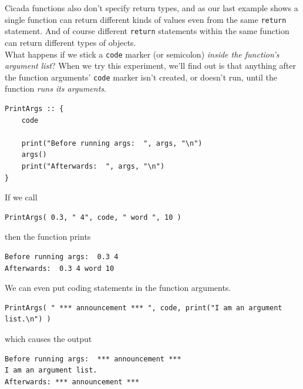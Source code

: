 \documentclass{article}
\newenvironment{code}{
       \begin{list}{}{
               \setlength{\leftmargin}{.4in}
               \setlength{\rightmargin}{0in}
               \setlength{\topsep}{.2in}
       }
       \small
       \item[] }
       { \end{list}   }
\begin{document}
\noindent Cicada functions also don't specify return types, and as our last example shows a single function can return different kinds of values even from the same \verb#return# statement.  And of course different \verb#return# statements within the same function can return different types of objects.\\

What happens if we stick a \texttt{code} marker (or semicolon) \emph{inside the function's argument list}?  When we try this experiment, we'll find out is that anything after the function arguments' \verb#code# marker isn't created, or doesn't run, until the function \emph{runs its arguments}.

\begin{code} \begin{verbatim}
PrintArgs :: {
    code
    
    print("Before running args:  ", args, "\n")
    args()
    print("Afterwards:  ", args, "\n")
}
\end{verbatim} \end{code}

\noindent If we call

\begin{code} \begin{verbatim}
PrintArgs( 0.3, " 4", code, " word ", 10 )
\end{verbatim} \end{code}

\noindent then the function prints

\begin{code} \begin{verbatim}
Before running args:  0.3 4
Afterwards:  0.3 4 word 10
\end{verbatim} \end{code}

\noindent We can even put coding statements in the function arguments.

\begin{code} \begin{verbatim}
PrintArgs( " *** announcement *** ", code, print("I am an argument list.\n") )
\end{verbatim} \end{code}

\noindent which causes the output

\begin{code} \begin{verbatim}
Before running args:  *** announcement *** 
I am an argument list.
Afterwards: *** announcement *** 
\end{verbatim} \end{code}
\end{document}
